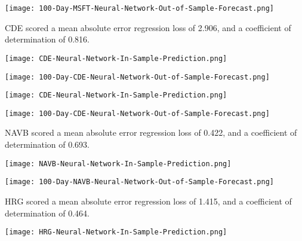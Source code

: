 \begin{center}  
    \texttt{[image: 100-Day-MSFT-Neural-Network-Out-of-Sample-Forecast.png]}
    \label{fig:nonfloat}
\end{center}

CDE scored a mean absolute error regression loss of 2.906, and a coefficient of determination of 0.816.

\texttt{[image: CDE-Neural-Network-In-Sample-Prediction.png]}

\texttt{[image: 100-Day-CDE-Neural-Network-Out-of-Sample-Forecast.png]}

\begin{center}
    \texttt{[image: CDE-Neural-Network-In-Sample-Prediction.png]}
    \label{fig:nonfloat}
\end{center}

\begin{center}  
    \texttt{[image: 100-Day-CDE-Neural-Network-Out-of-Sample-Forecast.png]}
    \label{fig:nonfloat}
\end{center}

NAVB scored a mean absolute error regression loss of 0.422, and a coefficient of determination of 0.693.

\begin{center}
    \texttt{[image: NAVB-Neural-Network-In-Sample-Prediction.png]}
    \label{fig:nonfloat}
\end{center}

\begin{center}  
    \texttt{[image: 100-Day-NAVB-Neural-Network-Out-of-Sample-Forecast.png]}
    \label{fig:nonfloat}
\end{center}

HRG scored a mean absolute error regression loss of 1.415, and a coefficient of determination of 0.464.

\begin{center}
    \texttt{[image: HRG-Neural-Network-In-Sample-Prediction.png]}
    \label{fig:nonfloat}
\end{center}

